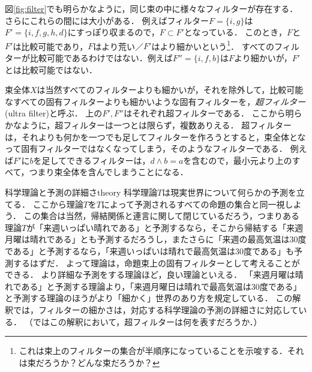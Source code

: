 \documentclass[11pt,a4paper, dvipdfmx]{jsarticle}
\begin{document}

図\ref{fig:filter}でも明らかなように，同じ束の中に様々なフィルターが存在する．
さらにこれらの間には大小がある．
例えばフィルター$F = \{i,g\}$は$F' = \{i, f, g, h, d\}$にすっぽり収まるので，$F \subset F'$となっている．
このとき，$F$と$F'$は比較可能であり，$F$はより荒い／$F'$はより細かいという\footnote{これは束上のフィルターの集合が半順序になっていることを示唆する．それは束だろうか？どんな束だろうか？}．
すべてのフィルターが比較可能であるわけではない．例えば$F'' = \{i, f, b\}$は$F$より細かいが，$F'$とは比較可能ではない．

束全体$X$は当然すべてのフィルターよりも細かいが，それを除外して，比較可能なすべての固有フィルターよりも細かいような固有フィルターを，\emph{超フィルター}(ultra filter)と呼ぶ．
上の$F', F''$はそれぞれ超フィルターである．
ここから明らかなように，超フィルターは一つとは限らず，複数ありえる．
超フィルターは，それよりも何かを一つでも足してフィルターを作ろうとすると，束全体となって固有フィルターではなくなってしまう，そのようなフィルターである．
例えば$F'$に$b$を足してできるフィルターは，$d \wedge b = a$を含むので，最小元より上のすべて，つまり束全体を含んでしまうことになる．


\begin{rei}{科学理論と予測の詳細さ}{theory}
科学理論$T$は現実世界について何らかの予測を立てる．
ここから理論$T$を$T$によって予測されるすべての命題の集合と同一視しよう．
この集合は当然，帰結関係と連言に関して閉じているだろう，つまりある理論$T$が「来週いっぱい晴れである」と予測するなら，そこから帰結する「来週月曜は晴れである」とも予測するだろうし，またさらに「来週の最高気温は30度である」と予測するなら，「来週いっぱいは晴れで最高気温は30度である」も予測するはずだ．
よって理論は，命題束上の固有フィルターとして考えることができる．
より詳細な予測をする理論ほど，良い理論といえる．
「来週月曜は晴れである」と予測する理論より，「来週月曜日は晴れで最高気温は30度である」と予測する理論のほうがより「細かく」世界のあり方を規定している．
この解釈では，フィルターの細かさは，対応する科学理論の予測の詳細さに対応している．
（ではこの解釈において，超フィルターは何を表すだろうか．）
\end{rei}
\end{document}
